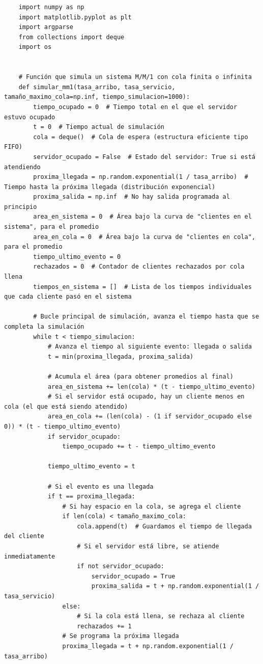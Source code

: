 \documentclass[12pt]{article}
\begin{document}
\begin{verbatim}
    import numpy as np
    import matplotlib.pyplot as plt
    import argparse
    from collections import deque
    import os
    
    
    # Función que simula un sistema M/M/1 con cola finita o infinita
    def simular_mm1(tasa_arribo, tasa_servicio, tamaño_maximo_cola=np.inf, tiempo_simulacion=1000):
        tiempo_ocupado = 0  # Tiempo total en el que el servidor estuvo ocupado
        t = 0  # Tiempo actual de simulación
        cola = deque()  # Cola de espera (estructura eficiente tipo FIFO)
        servidor_ocupado = False  # Estado del servidor: True si está atendiendo
        proxima_llegada = np.random.exponential(1 / tasa_arribo)  # Tiempo hasta la próxima llegada (distribución exponencial)
        proxima_salida = np.inf  # No hay salida programada al principio
        area_en_sistema = 0  # Área bajo la curva de "clientes en el sistema", para el promedio
        area_en_cola = 0  # Área bajo la curva de "clientes en cola", para el promedio
        tiempo_ultimo_evento = 0
        rechazados = 0  # Contador de clientes rechazados por cola llena
        tiempos_en_sistema = []  # Lista de los tiempos individuales que cada cliente pasó en el sistema
    
        # Bucle principal de simulación, avanza el tiempo hasta que se completa la simulación
        while t < tiempo_simulacion:
            # Avanza el tiempo al siguiente evento: llegada o salida
            t = min(proxima_llegada, proxima_salida)
    
            # Acumula el área (para obtener promedios al final)
            area_en_sistema += len(cola) * (t - tiempo_ultimo_evento)
            # Si el servidor está ocupado, hay un cliente menos en cola (el que está siendo atendido)
            area_en_cola += (len(cola) - (1 if servidor_ocupado else 0)) * (t - tiempo_ultimo_evento)
            if servidor_ocupado:
                tiempo_ocupado += t - tiempo_ultimo_evento
    
            tiempo_ultimo_evento = t
    
            # Si el evento es una llegada
            if t == proxima_llegada:
                # Si hay espacio en la cola, se agrega el cliente
                if len(cola) < tamaño_maximo_cola:
                    cola.append(t)  # Guardamos el tiempo de llegada del cliente
                    # Si el servidor está libre, se atiende inmediatamente
                    if not servidor_ocupado:
                        servidor_ocupado = True
                        proxima_salida = t + np.random.exponential(1 / tasa_servicio)
                else:
                    # Si la cola está llena, se rechaza al cliente
                    rechazados += 1
                # Se programa la próxima llegada
                proxima_llegada = t + np.random.exponential(1 / tasa_arribo)
    

\end{verbatim}
\end{document}
